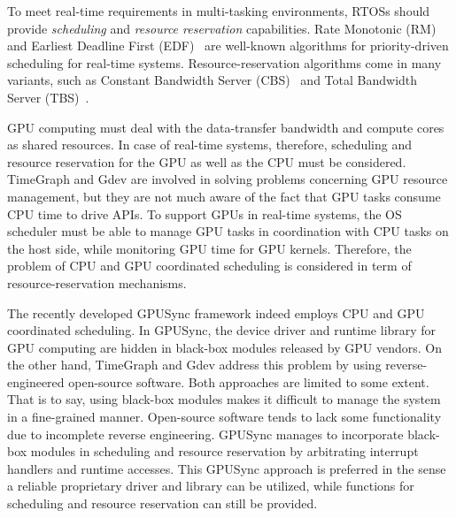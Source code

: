 To meet real-time requirements in multi-tasking environments, RTOSs should provide \textit{scheduling} and \textit{resource reservation} capabilities.
Rate Monotonic (RM) and Earliest Deadline First (EDF)~\cite{sched:ll} are well-known algorithms for priority-driven scheduling for real-time systems.
Resource-reservation algorithms come in many variants, such as Constant Bandwidth Server (CBS)~\cite{rr:cbs} and Total Bandwidth Server (TBS)~\cite{rr:tbs2}.

GPU computing must deal with the data-transfer bandwidth and compute cores as shared resources.
In case of real-time systems, therefore, scheduling and resource reservation for the GPU as well as the CPU must be considered.
TimeGraph and Gdev are involved in solving problems concerning GPU resource management, but they are not much aware of the fact that GPU tasks consume CPU time to drive APIs.
To support GPUs in real-time systems, the OS scheduler must be able to manage GPU tasks in coordination with CPU tasks on the host side, while monitoring GPU time for GPU kernels.
Therefore, the problem of CPU and GPU coordinated scheduling is considered in term of resource-reservation mechanisms.

The recently developed GPUSync framework indeed employs CPU and GPU coordinated scheduling.
In GPUSync, the device driver and runtime library for GPU computing are hidden in black-box modules released by GPU vendors.
On the other hand, TimeGraph and Gdev address this problem by using reverse-engineered open-source software.
Both approaches are limited to some extent.
That is to say, using black-box modules makes it difficult to manage the system in a fine-grained manner.
Open-source software tends to lack some functionality due to incomplete reverse engineering.
GPUSync manages to incorporate black-box modules in scheduling and resource reservation by arbitrating interrupt handlers and runtime accesses.
This GPUSync approach is preferred in the sense a reliable proprietary driver and library can be utilized, while functions for scheduling and resource reservation can still be provided.

